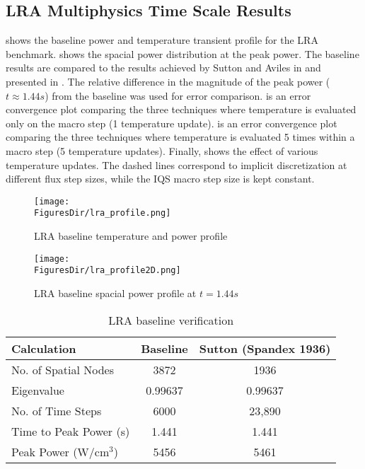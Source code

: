 \subsection{LRA Multiphysics Time Scale Results}

 shows the baseline power and temperature transient profile for the LRA benchmark.  shows the spacial power distribution at the peak power.  The baseline results are compared to the results achieved by Sutton and Aviles in \cite{Sutton_1996} and presented in .  The relative difference in the magnitude of the peak power ($t\approx1.44 s$) from the baseline was used for error comparison.   is an error convergence plot comparing the three techniques where temperature is evaluated only on the macro step (1 temperature update).   is an error convergence plot comparing the three techniques where temperature is evaluated 5 times within a macro step (5 temperature updates).  Finally,  shows the effect of various temperature updates. The dashed lines correspond to implicit discretization at different flux step sizes, while the IQS macro step size is kept constant.

\begin{figure}[htbp!]
\centering
\texttt{[image: \\FiguresDir/lra\_profile.png]}
\caption{LRA baseline temperature and power profile}
\label{fig:lra_profile}
\end{figure}

\begin{figure}[htbp!]
\centering
\texttt{[image: \\FiguresDir/lra\_profile2D.png]}
\caption{LRA baseline spacial power profile at $t=1.44 s$}
\label{fig:lra_profile2D}
\end{figure}

\begin{table}[!htbp]
\begin{center}
\begin{tabular}{|l|cc|}
\hline
Calculation  &  Baseline & Sutton (Spandex 1936) \\
\hline
No. of Spatial Nodes	& 3872 		& 1936 \\
Eigenvalue 				& 0.99637	& 0.99637 \\
No. of Time Steps 		& 6000 		& 23,890 \\
Time to Peak Power (s) 	& 1.441 	& 1.441 \\
Peak Power (W/cm$^3$) 	& 5456 		& 5461 \\
\hline
\end{tabular}
\end{center}
\caption{LRA baseline verification}
\label{tab:base}
\end{table}

